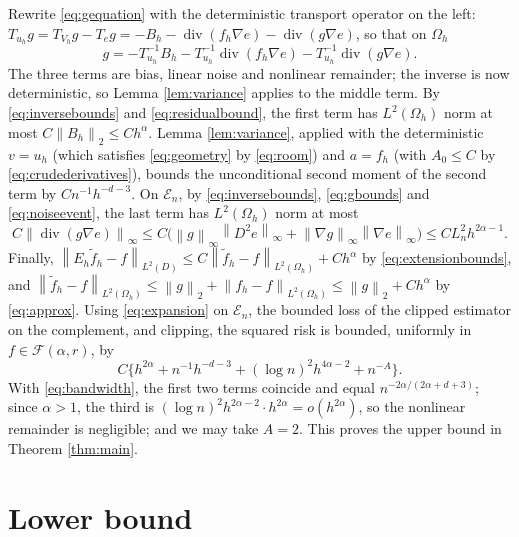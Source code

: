 \documentclass[11pt]{article}
\numberwithin{equation}{section}
\newcommand{\norm}[1]{\left\|#1\right\|}
\newcommand{\diver}{\operatorname{div}}
\begin{document}
Rewrite \eqref{eq:gequation} with the deterministic transport operator
on the left: $T_{u_h}g=T_{V_h}g-T_eg=-B_h-\diver(f_h\nabla e)
-\diver(g\nabla e)$, so that on $\Omega_h$
\begin{equation}\label{eq:expansion}
 g=-T_{u_h}^{-1}B_h
   -T_{u_h}^{-1}\diver(f_h\nabla e)
   -T_{u_h}^{-1}\diver(g\nabla e).
\end{equation}
The three terms are bias, linear noise and nonlinear remainder; the
inverse is now deterministic, so Lemma \ref{lem:variance} applies to
the middle term. By
\eqref{eq:inversebounds} and \eqref{eq:residualbound}, the first term
has $L^2(\Omega_h)$ norm at most $C\norm{B_h}_2\le Ch^\alpha$. Lemma
\ref{lem:variance}, applied with the deterministic $v=u_h$ (which
satisfies \eqref{eq:geometry} by \eqref{eq:room}) and $a=f_h$ (with
$A_0\le C$ by \eqref{eq:crudederivatives}), bounds the unconditional
second moment of the second term by $Cn^{-1}h^{-d-3}$. On
$\mathcal E_n$, by \eqref{eq:inversebounds}, \eqref{eq:gbounds} and
\eqref{eq:noiseevent}, the last term has $L^2(\Omega_h)$ norm at most
\begin{equation}\label{eq:remainder}
 C\norm{\diver(g\nabla e)}_\infty\le
 C\big(\norm g_\infty\norm{D^2e}_\infty
       +\norm{\nabla g}_\infty\norm{\nabla e}_\infty\big)
 \le CL_n^2h^{2\alpha-1}.
\end{equation}
Finally, $\norm{E_h\widetilde f_h-f}_{L^2(D)}\le
C\norm{\widetilde f_h-f}_{L^2(\Omega_h)}+Ch^\alpha$ by
\eqref{eq:extensionbounds}, and
$\norm{\widetilde f_h-f}_{L^2(\Omega_h)}\le\norm g_2+\norm{f_h-f}_{L^2(\Omega_h)}
\le\norm g_2+Ch^\alpha$ by \eqref{eq:approx}. Using
\eqref{eq:expansion} on $\mathcal E_n$, the bounded loss of the
clipped estimator on the complement, and clipping, the squared risk is
bounded, uniformly in $f\in\mathcal F(\alpha,r)$, by
\begin{equation}\label{eq:riskupper}
 C\{h^{2\alpha}+n^{-1}h^{-d-3}
           +(\log n)^2h^{4\alpha-2}+n^{-A}\}.
\end{equation}
With \eqref{eq:bandwidth}, the first two terms coincide and equal
$n^{-2\alpha/(2\alpha+d+3)}$; since $\alpha>1$, the third is
$(\log n)^2h^{2\alpha-2}\cdot h^{2\alpha}=o(h^{2\alpha})$, so the
nonlinear remainder is negligible; and we may take $A=2$. This proves
the upper bound in Theorem \ref{thm:main}.

\section{Lower bound}\label{sec:lower}
\end{document}
